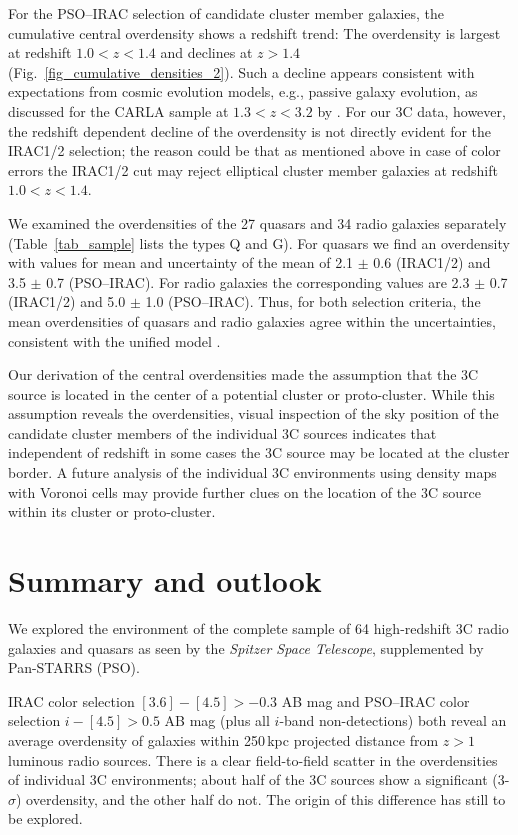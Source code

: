 \documentclass[mathleft,fleqn,%
]{an}
\begin{document}
For the PSO--IRAC selection of candidate cluster member galaxies, 
the cumulative central overdensity shows a redshift trend: 
The overdensity is largest at redshift $1.0 < z < 1.4$ and
declines at $z > 1.4$ (Fig.~\ref{fig_cumulative_densities_2}).
Such a decline appears consistent with expectations from cosmic
evolution models, e.g., passive galaxy evolution, 
as discussed for the CARLA sample at $1.3<z<3.2$ by \citet{Wylezalek14}. 
For our 3C data, 
however, 
the redshift dependent decline of the overdensity is not directly 
evident for the IRAC1/2 selection; 
the reason could be that as mentioned above in case of color errors the IRAC1/2 cut may reject elliptical cluster member galaxies at redshift $1.0 < z < 1.4$.

We examined the overdensities of the 27 quasars and 34 radio
galaxies separately (Table~\ref{tab_sample} lists the types Q and G). 
For quasars we find an overdensity with values for mean and uncertainty of
the mean of 
2.1 $\pm$ 0.6 (IRAC1/2) and 3.5 $\pm$ 0.7 (PSO--IRAC).
For radio galaxies the corresponding values are 
2.3 $\pm$ 0.7 (IRAC1/2) and 5.0 $\pm$ 1.0 (PSO--IRAC).
Thus, for both selection criteria, the mean overdensities 
of quasars and radio
galaxies agree within the uncertainties, 
consistent with the unified model \citep{Barthel89}.

Our derivation of the central
overdensities made the assumption that the 3C source is
located in the 
center of a potential cluster or proto-cluster. 
While  this
assumption reveals the  overdensities, 
visual inspection of the sky position of the candidate 
cluster members of the individual 3C sources indicates  
that  independent of redshift  in some cases the 3C 
source may be located at the cluster border. 
A future analysis of the individual 3C environments using density
maps with Voronoi cells
may provide further clues on the location of the 3C source within its 
cluster or proto-cluster. 

\section{Summary and outlook } 
\label{sec:summary}

We explored the environment of 
the complete sample of 64 high-redshift 3C radio galaxies and quasars 
as seen by the {\it Spitzer Space Telescope}, supplemented by 
Pan-STARRS (PSO).

IRAC color selection $[3.6] - [4.5] > -0.3$ AB mag and 
PSO--IRAC color selection $i - [4.5] > 0.5$ AB mag (plus all $i$-band
non-detections)
both reveal an average 
overdensity of galaxies within 250\,kpc projected distance from $z>1$ luminous
radio sources.
There is a clear field-to-field scatter in the overdensities of individual
3C environments; about half of the 3C sources show a significant (3-$\sigma$)
overdensity, and the other half do not. 
The origin of this difference has still to be explored.
\end{document}
